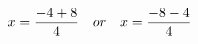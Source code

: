 \documentclass[preview]{standalone}
\begin{document}
\begin{align*}
\special{dvisvgm:raw <g id='unique000'>}x=\frac{-4 + 8}{4} \quad or \quad x=\frac{-8 - 4}{4}\special{dvisvgm:raw </g>}
\end{align*}
\end{document}
